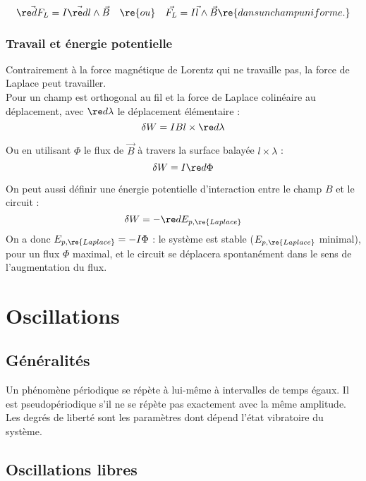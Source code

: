 \documentclass[13pt, twoside, a4paper, french]{report}
\begin{document}
            \[\vec{\re dF_L} = I \vec{\re dl} \wedge \vec B \quad \re{ou} \quad \vec{F_L} = I \vec l \wedge \vec B \re{ dans un champ uniforme.}\]
        
        \subsection{Travail et énergie potentielle}
            
            Contrairement à la force magnétique de Lorentz qui ne travaille pas, la force de Laplace peut travailler.\\
            Pour un champ est orthogonal au fil et la force de Laplace colinéaire au déplacement, avec $\re d \lambda$ le déplacement élémentaire :
            \[\delta W = I B l \times \re d \lambda\]
            
            Ou en utilisant $\Phi$ le flux de $\vec B$ à travers la surface balayée $l \times \lambda$ :
            \[\delta W = I \re d \Phi\]
            
            On peut aussi définir une énergie potentielle d’interaction entre le champ $B$ et le circuit :
            \[\delta W = - \re d E_{p,\re{Laplace}}\]
            On a donc $E_{p,\re{Laplace}} = - I \Phi$ : le système est stable ($E_{p,\re{Laplace}}$ minimal), pour un flux $\Phi$ maximal, et le circuit se déplacera spontanément dans le sens de l’augmentation du flux.


\chapter{Oscillations}
    
    
    \section{Généralités}
        
        Un phénomène périodique se répète à lui-même à intervalles de temps égaux.
        Il est pseudopériodique s'il ne se répète pas exactement avec la même amplitude.\\
        Les degrés de liberté sont les paramètres dont dépend l’état vibratoire du système.\\
    
    
    \section{Oscillations libres}
        
\end{document}
